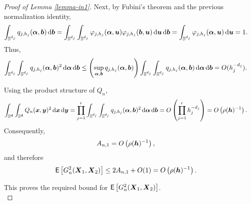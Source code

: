 \documentclass[oneside,11pt]{article}
\begin{document}
\begin{proof}[Proof of Lemma \ref{lemma-in1}]
Next, by Fubini's theorem and the previous normalization identity,
\[
\int_{\Sj}q_{j,h_j}(\ba,\bb)\,\rd \bb
=
\int_{\Sj}\int_{\Sj}\varphi_{j,h_j}(\ba,\bu)\varphi_{j,h_j}(\bb,\bu)\,\rd \bu\,\rd \bb
=
\int_{\Sj}\varphi_{j,h_j}(\ba,\bu)\,\rd \bu
=
1.
\]
Thus,
\[
\int_{\Sj}\int_{\Sj}q_{j,h_j}(\ba,\bb)^2\,\rd \ba\,\rd \bb
\leq
\lrp{\sup_{\ba,\bb}q_{j,h_j}(\ba,\bb)}
\int_{\Sj}\int_{\Sj}q_{j,h_j}(\ba,\bb)\,\rd \ba\,\rd \bb
=
O(h_j^{-d_j}).
\]

Using the product structure of \(Q_n\),
\[
\int_{\Sr}\int_{\Sr}Q_n(\bx,\by)^2\,\rd \bx\,\rd \by
=
\prod_{j=1}^r
\int_{\Sj}\int_{\Sj}q_{j,h_j}(\ba,\bb)^2\,\rd \ba\,\rd \bb
=
O\lrp{\prod_{j=1}^r h_j^{-d_j}}
=
O\lrp{\rho(\bh)^{-1}}.
\]
Consequently,
\[
A_{n,1}=O\lrp{\rho(\bh)^{-1}},
\]
and therefore
\[
\mathsf{E}\lrc{G_n^2(\bX_1,\bX_2)}
\leq 2A_{n,1}+O(1)
=
O\lrp{\rho(\bh)^{-1}}.
\]

This proves the required bound for \(\mathsf{E}\lrc{G_n^2(\bX_1,\bX_2)}\). \\

\end{proof}
\end{document}

